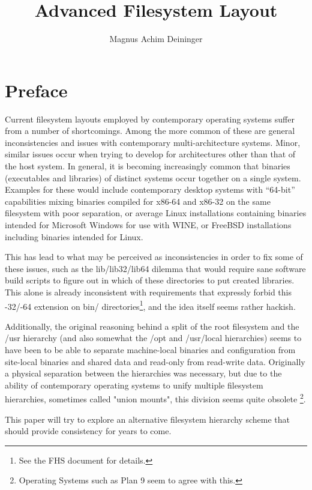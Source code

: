 \documentclass[a4paper,twoside,titlepage]{article}
\title{Advanced Filesystem Layout}
\author{Magnus Achim Deininger}
\begin{document}
\maketitle
\tableofcontents

\newpage

\section*{Preface}
Current filesystem layouts employed by contemporary operating systems suffer
from a number of shortcomings. Among the more common of these are general
inconsistencies and issues with contemporary multi-architecture systems. Minor,
similar issues occur when trying to develop for architectures other than that of
the host system. In general, it is becoming increasingly common that binaries
(executables and libraries) of distinct systems occur together on a single
system. Examples for these would include contemporary desktop systems with
``64-bit'' capabilities mixing binaries compiled for x86-64 and x86-32 on the
same filesystem with poor separation, or average Linux installations containing
binaries intended for Microsoft Windows for use with WINE, or FreeBSD
installations including binaries intended for Linux.

This has lead to what may be perceived as inconsistencies in order to fix some
of these issues, such as the lib/lib32/lib64 dilemma that would require sane
software build scripts to figure out in which of these directories to put
created libraries. This alone is already inconsistent with requirements that
expressly forbid this -32/-64 extension on bin/ directories\footnote{See the FHS
document for details.}, and the idea itself seems rather hackish.

Additionally, the original reasoning behind a split of the root filesystem and
the /usr hierarchy (and also somewhat the /opt and /usr/local hierarchies) seems
to have been to be able to separate machine-local binaries and configuration
from site-local binaries and shared data and read-only from read-write data.
Originally a physical separation between the hierarchies was necessary, but due
to the ability of contemporary operating systems to unify multiple filesystem
hierarchies, sometimes called "union mounts", this division seems quite obsolete
\footnote{Operating Systems such as Plan 9 seem to agree with this.}.

This paper will try to explore an alternative filesystem hierarchy scheme that
should provide consistency for years to come.
\newpage
\end{document}
